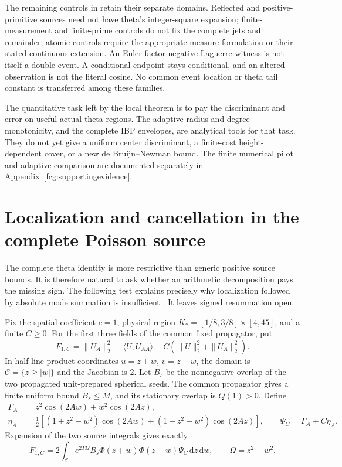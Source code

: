 \documentclass[11pt]{article}
\numberwithin{equation}{section}
\newcommand{\dd}{\,\mathrm d}
\begin{document}
The remaining controls in \cite{CollisionControls} retain their
separate domains. Reflected and positive-primitive sources need not
have theta's integer-square expansion; finite-measurement and
finite-prime controls do not fix the complete jets and remainder;
atomic controls require the appropriate measure formulation or their
stated continuous extension. An Euler-factor negative-Laguerre
witness is not itself a double event. A conditional endpoint stays
conditional, and an altered observation is not the literal cosine.
No common event location or theta tail constant is transferred among
these families.

The quantitative task left by the local theorem is to pay the
discriminant and error on useful actual theta regions. The adaptive
radius and degree monotonicity, and the complete IBP envelopes, are
analytical tools for that task. They do not yet give a uniform center
discriminant, a finite-cost height-dependent cover, or a new
de Bruijn--Newman bound. The finite numerical pilot and adaptive
comparison are documented separately in
Appendix~\ref{fcg:supportingevidence}.

\section{Localization and cancellation in the complete Poisson source}
\label{fcg:poissonloss}

The complete theta identity is more restrictive than generic positive
source bounds. It is therefore natural to ask whether an arithmetic
decomposition pays the missing sign. The following test explains
precisely why localization followed by absolute mode summation is
insufficient \cite{FCGPoissonLocalization}. It leaves signed resummation
open.

Fix the spatial coefficient $c=1$, physical region
$K_*=[1/8,3/8]\times[4,45]$, and a finite $C\ge0$. For the first
three fields of the common fixed propagator, put
\[
 F_{1,C}=\|U_A\|_2^2-\langle U,U_{AA}\rangle
                   +C(\|U\|_2^2+\|U_A\|_2^2).
\]
In half-line product coordinates $u=z+w$, $v=z-w$, the domain is
$\mathcal C=\{z\ge|w|\}$ and the Jacobian is 2. Let $B_s$ be the
nonnegative overlap of the two propagated unit-prepared spherical
seeds. The common propagator gives a finite uniform bound $B_s\le M$,
and its stationary overlap is $Q(1)>0$. Define
\begin{align*}
 \Gamma_A&=z^2\cos(2Aw)+w^2\cos(2Az),\\
 \eta_A&=\tfrac12[(1+z^2-w^2)\cos(2Aw)
                       +(1-z^2+w^2)\cos(2Az)],\qquad
 \Psi_C=\Gamma_A+C\eta_A.
\end{align*}
Expansion of the two source integrals gives exactly
\[
 F_{1,C}=2\int_{\mathcal C}e^{2T\Omega}B_s
        \Phi(z+w)\Phi(z-w)\Psi_C\dd z\dd w,\qquad
 \Omega=z^2+w^2.
\]
\end{document}
